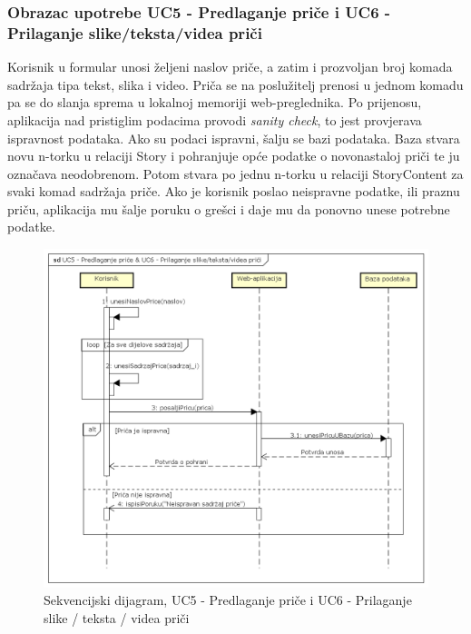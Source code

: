 				\subsubsection{Obrazac upotrebe UC5 - Predlaganje priče i UC6 - Prilaganje slike/teksta/videa priči}
					\noindent Korisnik u formular unosi željeni naslov priče, a zatim i prozvoljan broj komada sadržaja tipa tekst, slika i video. Priča se na poslužitelj prenosi u jednom komadu pa se do slanja sprema u lokalnoj memoriji web-preglednika. Po prijenosu, aplikacija nad pristiglim podacima provodi \textit{sanity check}, to jest provjerava ispravnost podataka. Ako su podaci ispravni, šalju se bazi podataka. Baza stvara novu n-torku u relaciji Story i pohranjuje opće podatke o novonastaloj priči te ju označava neodobrenom. Potom stvara po jednu n-torku u relaciji StoryContent za svaki komad sadržaja priče. Ako je korisnik poslao neispravne podatke, ili praznu priču, aplikacija mu šalje poruku o grešci i daje mu da ponovno unese potrebne podatke.
					\begin{figure}[H]
						\includegraphics[width=.9\linewidth]{dijagrami/SD_UC5&UC6.png}
						\centering
						\caption{Sekvencijski dijagram, UC5 - Predlaganje priče i UC6 - Prilaganje slike / teksta / videa priči}	
						\label{fig:sekvdija1}
					\end{figure}
				\eject
				
